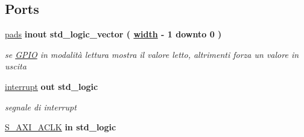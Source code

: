 \subsection*{Ports}
 \begin{DoxyCompactItemize}
\item 
\mbox{\label{classGPIO__v1__0__S00__AXI_ac0744a550c27f11ab186fd7a1156a54e}} 
\hyperlink{classGPIO__v1__0__S00__AXI_ac0744a550c27f11ab186fd7a1156a54e}{pads}  {\bfseries {\bfseries \textcolor{vhdlchar}{inout}\textcolor{vhdlchar}{ }}} {\bfseries \textcolor{vhdlchar}{std\+\_\+logic\+\_\+vector}\textcolor{vhdlchar}{ }\textcolor{vhdlchar}{(}\textcolor{vhdlchar}{ }\textcolor{vhdlchar}{ }\textcolor{vhdlchar}{ }\textcolor{vhdlchar}{ }{\bfseries \hyperlink{classGPIO__v1__0__S00__AXI_a16bbf9205afa677edb8a74dcd39ebb9f}{width}} \textcolor{vhdlchar}{-\/}\textcolor{vhdlchar}{ } \textcolor{vhdldigit}{1} \textcolor{vhdlchar}{ }\textcolor{vhdlchar}{downto}\textcolor{vhdlchar}{ }\textcolor{vhdlchar}{ } \textcolor{vhdldigit}{0} \textcolor{vhdlchar}{ }\textcolor{vhdlchar}{)}\textcolor{vhdlchar}{ }} 
\begin{DoxyCompactList}\small\item\em se \hyperlink{structGPIO}{G\+P\+IO} in modalità lettura mostra il valore letto, altrimenti forza un valore in uscita \end{DoxyCompactList}\item 
\mbox{\label{classGPIO__v1__0__S00__AXI_a5b78f3e3edfaf6e8ec79031b9e631e9d}} 
\hyperlink{classGPIO__v1__0__S00__AXI_a5b78f3e3edfaf6e8ec79031b9e631e9d}{interrupt}  {\bfseries {\bfseries \textcolor{vhdlchar}{out}\textcolor{vhdlchar}{ }}} {\bfseries \textcolor{vhdlchar}{std\+\_\+logic}\textcolor{vhdlchar}{ }} 
\begin{DoxyCompactList}\small\item\em segnale di interrupt \end{DoxyCompactList}\item 
\mbox{\label{classGPIO__v1__0__S00__AXI_a3f54d782a88290bdaa6baffd7cd84ab4}} 
\hyperlink{classGPIO__v1__0__S00__AXI_a3f54d782a88290bdaa6baffd7cd84ab4}{S\+\_\+\+A\+X\+I\+\_\+\+A\+C\+LK}  {\bfseries {\bfseries \textcolor{vhdlchar}{in}\textcolor{vhdlchar}{ }}} {\bfseries \textcolor{vhdlchar}{std\+\_\+logic}\textcolor{vhdlchar}{ }} 
\item 
\mbox{\label{classGPIO__v1__0__S00__AXI_a089b396e17dee353ccc7d5389dda5532}} 

\end{DoxyCompactItemize}
